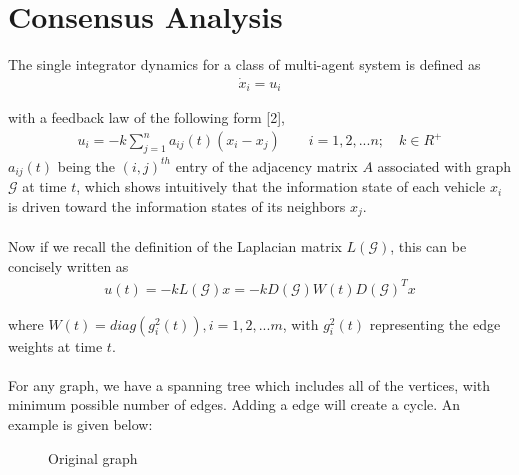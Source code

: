 \documentclass[journal]{IEEEtran}
\begin{document}
\section{Consensus Analysis}

The single integrator dynamics for a class of multi-agent system
is defined as \begin{align}\dot{x}_i = u_i\end{align}

with a feedback law of the following form [2], \begin{align} u_i = -k\sum_{j=1}^{n} a_{ij}(t)(x_i-x_j) \qquad i = 1,2,...n;\quad k \in R^+ \end{align} $a_{ij}(t)$ being the $(i,j)^{th}$ entry of the adjacency matrix $A$ associated with graph $\mathcal{G}$ at time $t$, which shows intuitively that the information state of each vehicle $x_i$ is driven toward the information states of its neighbors $x_j$.\\\\
Now if we recall the definition of the Laplacian matrix $L(\mathcal{G})$, this can be concisely written as \begin{align} u(t) = -kL(\mathcal{G})x = -kD(\mathcal{G})W(t)D(\mathcal{G})^Tx \end{align}

where $W(t) = diag(g_i^2(t)), i = {1,2,...m}$, with $g_i^2(t)$ representing the edge weights at time $t$.
\\\\
For any graph, we have a spanning tree which includes all of the vertices, with minimum possible number of edges. Adding a edge will create a cycle. An example is given below: 
\begin{figure}[h]
\caption{Original graph}
\end{figure}
\end{document}
